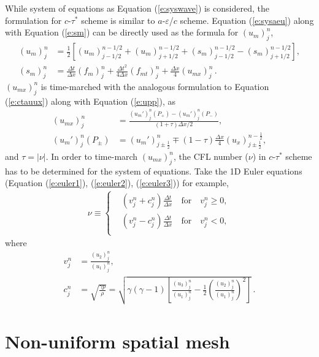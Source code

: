 \documentclass[letterpaper,12pt,dvips]{article}
\numberwithin{equation}{section}
\begin{document}
While system of equations as Equation (\ref{e:syswave}) is considered, 
the formulation for $c$-$\tau^*$ scheme is similar to 
$a$-$\varepsilon$/$c$ scheme.
Equation (\ref{e:sysaeu}) along with Equation (\ref{e:sm}) can be 
directly used as the formula for $(u_m)_j^n$, 
\begin{align*}
  (u_m)_j^n &= \frac{1}{2}\left[
      (u_m)_{j-1/2}^{n-1/2} + (u_m)_{j+1/2}^{n-1/2}
    + (s_m)_{j-1/2}^{n-1/2} - (s_m)_{j+1/2}^{n-1/2} 
    \right], \\
  (s_m)_j^n &= 
      \frac{\Delta t}  {\Delta x} (f_m)_j^n 
    + \frac{\Delta t^2}{4\Delta x}(f_{mt})_j^n
    + \frac{\Delta x}  {4}        (u_{mx})_j^n\,.
\end{align*}
$(u_{mx})_j^n$ is time-marched with the analogous formulation to 
Equation (\ref{e:ctauux}) along with Equation (\ref{e:upp}), as
\begin{align}
  (u_{mx})_j^n &= 
    \frac{(u_m')_j^n(P_+)-(u_m')_j^n(P_-)}
         {(1+\tau)\Delta x/2}, \\
  (u_m')_j^n(P_{\pm}) &= 
        (u_m')_{j\pm\frac{1}{2}}^n 
    \mp (1-\tau)\frac{\Delta x}{4}(u_x)_{j\pm\frac{1}{2}}^{n-\frac{1}{2}}, 
\end{align}
and $\tau=|\nu|$.
In order to time-march $(u_{mx})_j^n$, the CFL number ($\nu$) in 
$c$-$\tau^*$ scheme has to be determined for the system of equations.
Take the 1D Euler equations (Equation (\ref{e:euler1}), (\ref{e:euler2}), 
(\ref{e:euler3})) for example, 
\begin{align}
\nu \equiv \left\{
  \begin{aligned}
    &(v_j^n+c_j^n)\frac{\Delta t}{\Delta x} 
      \quad\text{for}\quad v_j^n \ge 0, \\
    &(v_j^n-c_j^n)\frac{\Delta t}{\Delta x} 
      \quad\text{for}\quad v_j^n < 0, \\
  \end{aligned}
  \right. \label{e:eulernu}
\end{align}
where
\begin{align}
  v_j^n &= 
    \frac{(u_2)_j^n}{(u_1)_j^n}, \label{e:eulerv} \\
  c_j^n &= \sqrt{\frac{\gamma p}{\rho}} = 
    \sqrt{\gamma(\gamma-1)
          \left[
              \frac{(u_3)_j^n}{(u_1)_j^n} 
            - \frac{1}{2}\left(\frac{(u_2)_j^n}{(u_1)_j^n}\right)^2
          \right]}\,. \label{e:eulerc}
\end{align}

\section{Non-uniform spatial mesh}
\label{s:nuni}
\end{document}
